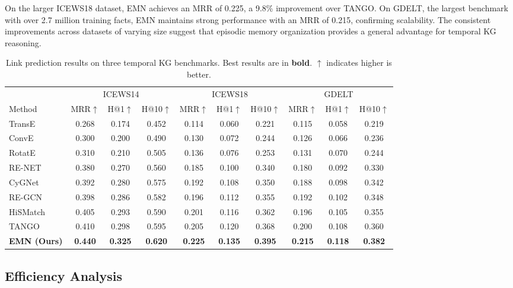 \documentclass{article}
\begin{document}
On the larger ICEWS18 dataset, EMN achieves an MRR of 0.225, a 9.8\% improvement over TANGO. On GDELT, the largest benchmark with over 2.7 million training facts, EMN maintains strong performance with an MRR of 0.215, confirming scalability. The consistent improvements across datasets of varying size suggest that episodic memory organization provides a general advantage for temporal KG reasoning.

\begin{table}[t]
\centering
\caption{Link prediction results on three temporal KG benchmarks. Best results are in \textbf{bold}. $\uparrow$ indicates higher is better.}
\label{tab:main_results}
\begin{tabular}{lccccccccc}
\toprule
& \multicolumn{3}{c}{ICEWS14} & \multicolumn{3}{c}{ICEWS18} & \multicolumn{3}{c}{GDELT} \\
\cmidrule(lr){2-4} \cmidrule(lr){5-7} \cmidrule(lr){8-10}
Method & MRR$\uparrow$ & H@1$\uparrow$ & H@10$\uparrow$ & MRR$\uparrow$ & H@1$\uparrow$ & H@10$\uparrow$ & MRR$\uparrow$ & H@1$\uparrow$ & H@10$\uparrow$ \\
\midrule
TransE  & 0.268 & 0.174 & 0.452 & 0.114 & 0.060 & 0.221 & 0.115 & 0.058 & 0.219 \\
ConvE   & 0.300 & 0.200 & 0.490 & 0.130 & 0.072 & 0.244 & 0.126 & 0.066 & 0.236 \\
RotatE  & 0.310 & 0.210 & 0.505 & 0.136 & 0.076 & 0.253 & 0.131 & 0.070 & 0.244 \\
\midrule
RE-NET  & 0.380 & 0.270 & 0.560 & 0.185 & 0.100 & 0.340 & 0.180 & 0.092 & 0.330 \\
CyGNet  & 0.392 & 0.280 & 0.575 & 0.192 & 0.108 & 0.350 & 0.188 & 0.098 & 0.342 \\
RE-GCN  & 0.398 & 0.286 & 0.582 & 0.196 & 0.112 & 0.355 & 0.192 & 0.102 & 0.348 \\
HiSMatch & 0.405 & 0.293 & 0.590 & 0.201 & 0.116 & 0.362 & 0.196 & 0.105 & 0.355 \\
TANGO   & 0.410 & 0.298 & 0.595 & 0.205 & 0.120 & 0.368 & 0.200 & 0.108 & 0.360 \\
\textbf{EMN (Ours)} & \textbf{0.440} & \textbf{0.325} & \textbf{0.620} & \textbf{0.225} & \textbf{0.135} & \textbf{0.395} & \textbf{0.215} & \textbf{0.118} & \textbf{0.382} \\
\bottomrule
\end{tabular}
\end{table}

\subsection{Efficiency Analysis}
\label{sec:exp:efficiency}
\end{document}
